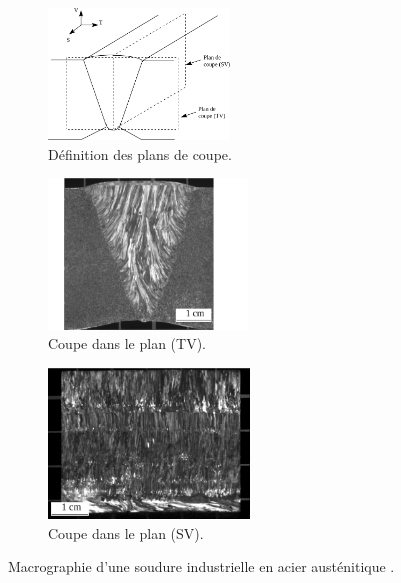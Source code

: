 \begin{figure}[!h]
	\hspace{-2cm}
    \centering
    \begin{subfigure}[c]{0.25\textwidth}
    	\centering
        \includegraphics[height=3.5cm]{./img/soudure3.png}
        \vspace{0.03cm}
        \caption{ Définition des plans de coupe.}
    \end{subfigure}
    \hspace{1cm}
    \begin{subfigure}[c]{0.25\textwidth}
    	\centering
        \includegraphics[height=4cm]{./img/soudure1.png}
        \caption{ Coupe dans le plan (TV).}
    \end{subfigure}
        \hspace{1.5cm}
    \begin{subfigure}[c]{0.25\textwidth}
    	\centering
		\includegraphics[height=4cm]{./img/soudure2.png}
        \caption{Coupe dans le plan (SV).}
    \end{subfigure}
    \caption{ Macrographie d'une soudure industrielle en acier austénitique \citep{chassignole}.\label{soudure}}
\end{figure}


